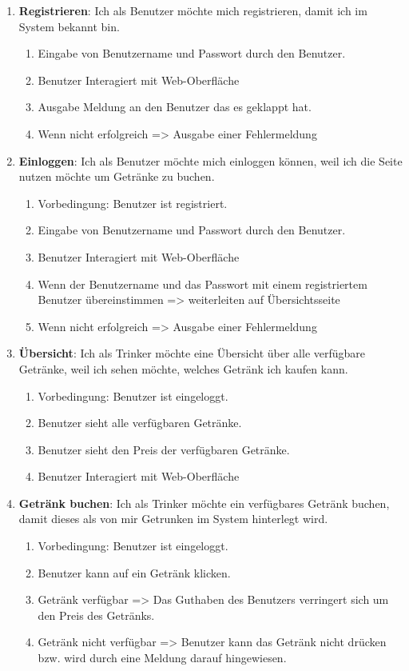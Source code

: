 \documentclass[conference,a4paper]{cs-techrep}
\begin{document}
\begin{enumerate}[{USM}1]
	
\item \textbf{Registrieren}: Ich als Benutzer möchte mich registrieren, damit ich im System bekannt bin.
	\begin{enumerate}
	\item Eingabe von Benutzername und Passwort durch den Benutzer.
	\item Benutzer Interagiert mit Web-Oberfläche
	\item Ausgabe Meldung an den Benutzer das es geklappt hat.
	\item Wenn nicht erfolgreich => Ausgabe einer Fehlermeldung
	\end{enumerate}

\item \textbf{Einloggen}: Ich als Benutzer möchte mich einloggen können, weil ich die Seite nutzen möchte um Getränke zu buchen.
\begin{enumerate}
	\item Vorbedingung: Benutzer ist registriert.
	\item Eingabe von Benutzername und Passwort durch den Benutzer.
	\item Benutzer Interagiert mit Web-Oberfläche
	\item Wenn der Benutzername und das Passwort mit einem registriertem Benutzer übereinstimmen => weiterleiten auf Übersichtsseite
	\item Wenn nicht erfolgreich => Ausgabe einer Fehlermeldung
\end{enumerate}

\item \textbf{Übersicht}: Ich als Trinker möchte eine Übersicht über alle verfügbare Getränke, weil ich sehen möchte, welches Getränk ich kaufen kann.
\begin{enumerate}
	\item Vorbedingung: Benutzer ist eingeloggt.
	\item Benutzer sieht alle verfügbaren Getränke.
	\item Benutzer sieht den Preis der verfügbaren Getränke.
	\item Benutzer Interagiert mit Web-Oberfläche
\end{enumerate}

\item \textbf{Getränk buchen}: Ich als Trinker möchte ein verfügbares Getränk buchen, damit dieses als von mir Getrunken im System hinterlegt wird.
\begin{enumerate}
	\item Vorbedingung: Benutzer ist eingeloggt.
	\item Benutzer kann auf ein Getränk klicken.
	\item Getränk verfügbar => Das Guthaben des Benutzers verringert sich um den Preis des Getränks.
	\item Getränk nicht verfügbar => Benutzer kann das Getränk nicht drücken bzw. wird durch eine Meldung darauf hingewiesen.
\end{enumerate}


\end{enumerate}
\end{document}
